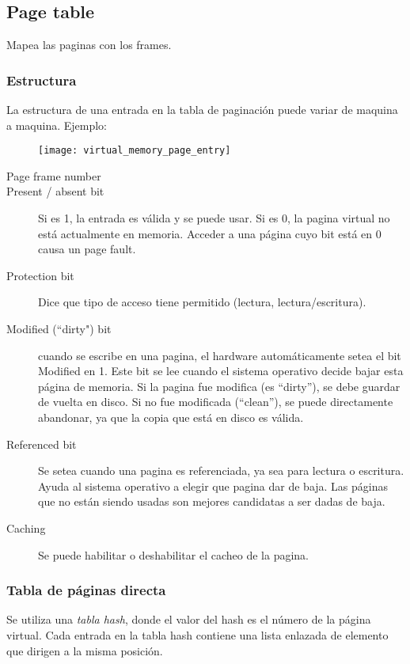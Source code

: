 \documentclass[a4paper, twoside]{article}
\begin{document}
\subsection{Page table}
Mapea las paginas con los frames.
\subsubsection{Estructura}
La estructura de una entrada en la tabla de paginación puede variar de maquina a maquina.
Ejemplo:
\begin{figure}[h]
	\centering
	\texttt{[image: virtual\_memory\_page\_entry]}
	\label{fig:virtual_memory_page_entry}
\end{figure}

\begin{description}
	\item[Page frame number]
	\item[Present / absent bit] Si es 1, la entrada es válida y se puede usar. Si es 0, la pagina virtual no está actualmente en memoria. Acceder a una página cuyo bit está en 0 causa un page fault.
	\item[Protection bit] Dice que tipo de acceso tiene permitido (lectura, lectura/escritura).
	\item[Modified (“dirty") bit] cuando se escribe en una pagina, el hardware automáticamente setea el bit Modified en 1. Este bit se lee cuando el sistema operativo decide bajar esta página de memoria. Si la pagina fue modifica (es “dirty”), se debe guardar de vuelta en disco. Si no fue modificada (“clean”), se puede directamente abandonar, ya que la copia que está en disco es válida.
	\item[Referenced bit] Se setea cuando una pagina es referenciada, ya sea para lectura o escritura. Ayuda al sistema operativo a elegir que pagina dar de baja. Las páginas que no están siendo usadas son mejores candidatas a ser dadas de baja.
	\item[Caching] Se puede habilitar o deshabilitar el cacheo de la pagina.
\end{description}

\subsubsection{Tabla de páginas directa}
Se utiliza una \emph{tabla hash}, donde el valor del hash es el número de la página virtual. Cada entrada en la tabla hash contiene una lista enlazada de elemento que dirigen a la misma posición.
\end{document}
